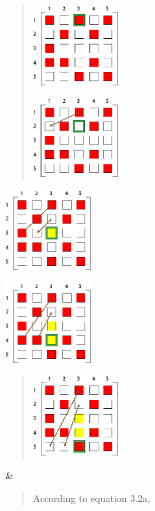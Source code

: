 \begin{minipage}[t]{\linewidth}\raggedright
\begin{quote}
\includegraphics[width=1.275in,height=1.19333in]{./Scheduler/media/image29.png}

\includegraphics[width=1.27222in,height=1.19044in]{./Scheduler/media/image30.png}
\end{quote}

\includegraphics[width=1.28055in,height=1.19882in]{./Scheduler/media/image31.png}

\includegraphics[width=1.28055in,height=1.19882in]{./Scheduler/media/image32.png}

\begin{quote}
\includegraphics[width=1.275in,height=1.19333in]{./Scheduler/media/image33.png}
\end{quote}
\end{minipage} & \begin{minipage}[t]{\linewidth}\raggedright
\begin{quote}
According to equation 3.2a,


\end{quote}
\end{minipage}
